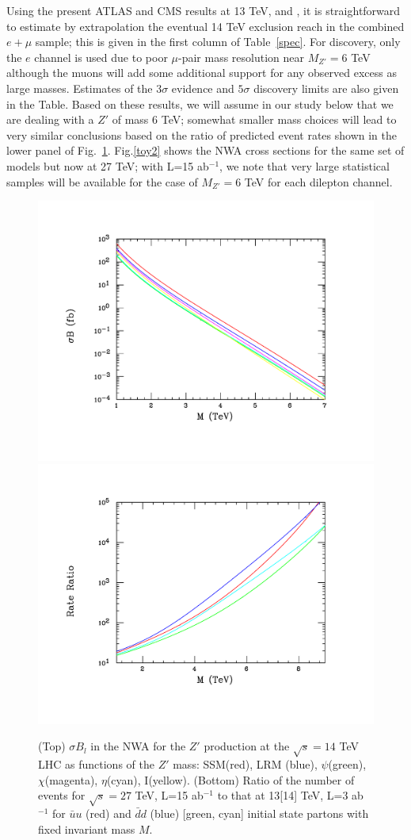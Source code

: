 Using the present ATLAS and CMS results at 13 TeV, \cite{Aaboud:2017buh} and \cite{Sirunyan:2018exx}, it is straightforward to estimate by extrapolation the eventual 14 TeV 
exclusion reach in the combined $e+\mu$ sample; this is given in the first column of Table~\ref{spec}. For discovery, only the $e$ channel is used due to poor $\mu$-pair mass 
resolution near $M_{Z'}=6$ TeV although the muons will add some additional support for any observed excess as large masses. Estimates of the $3\sigma$ evidence and $5\sigma$ 
discovery limits are also given in the Table. Based on these results, we will assume in our study below that we are dealing with a $Z'$ of mass 6 TeV; somewhat smaller mass 
choices will lead to very similar conclusions based on the ratio of predicted event rates shown in the lower panel of Fig.~\ref{toy}.  Fig.\ref{toy2} shows the NWA cross 
sections for the same set of models but now at 27 TeV; with L=15 ab$^{-1}$, we note that very large statistical samples will be available for the case of $M_{Z'}=6$ TeV 
for each dilepton channel. 


\begin{figure}[htbp]
  \centering
    \includegraphics[trim={2cm 2cm 2cm 2cm},clip,width=0.49\columnwidth]{Fig/zp14tev-ref.pdf}
    \includegraphics[trim={2cm 2cm 2cm 2cm},clip,width=0.49\columnwidth]{Fig/scaled-ratio.pdf}
\caption{(Top) $\sigma B_l$ in the NWA for the $Z'$ production at the $\sqrt s=14$ TeV LHC as functions of the $Z'$ mass: SSM(red), LRM (blue), $\psi$(green), $\chi$(magenta), 
$\eta$(cyan), I(yellow).  (Bottom) Ratio of the number of events  for $\sqrt s=27$ TeV, L=15 ab$^{-1}$ to that at 13[14] TeV, L=3 ab$^{-1}$ for 
$\bar u u$ (red) and $\bar d d$ (blue)  [green, cyan] initial state partons with fixed invariant mass $M$.}
\label{toy}
\end{figure}



